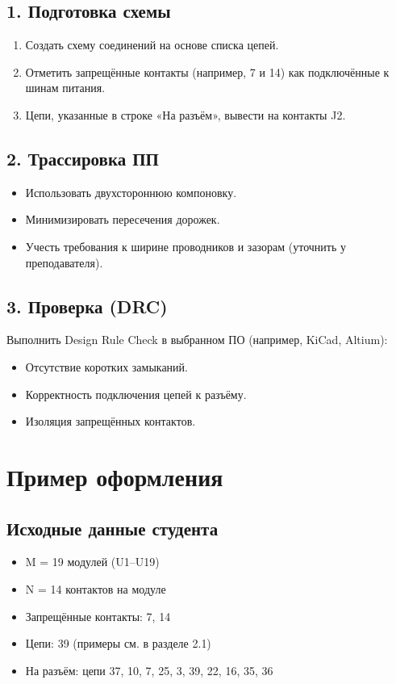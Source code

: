 \documentclass[a4paper, 12pt]{article}
\begin{document}
\subsection{1. Подготовка схемы}
\begin{enumerate}
	\item Создать схему соединений на основе списка цепей.
	\item Отметить запрещённые контакты (например, 7 и 14) как подключённые к шинам питания.
	\item Цепи, указанные в строке «На разъём», вывести на контакты J2.
\end{enumerate}

\subsection{2. Трассировка ПП}
\begin{itemize}
	\item Использовать двухстороннюю компоновку.
	\item Минимизировать пересечения дорожек.
	\item Учесть требования к ширине проводников и зазорам (уточнить у преподавателя).
\end{itemize}

\subsection{3. Проверка (DRC)}
Выполнить Design Rule Check в выбранном ПО (например, KiCad, Altium):
\begin{itemize}
	\item Отсутствие коротких замыканий.
	\item Корректность подключения цепей к разъёму.
	\item Изоляция запрещённых контактов.
\end{itemize}

\section{Пример оформления}
\subsection{Исходные данные студента}
\begin{itemize}
	\item M = 19 модулей (U1–U19)
	\item N = 14 контактов на модуле
	\item Запрещённые контакты: 7, 14
	\item Цепи: 39 (примеры см. в разделе 2.1)
	\item На разъём: цепи 37, 10, 7, 25, 3, 39, 22, 16, 35, 36
\end{itemize}
\end{document}
